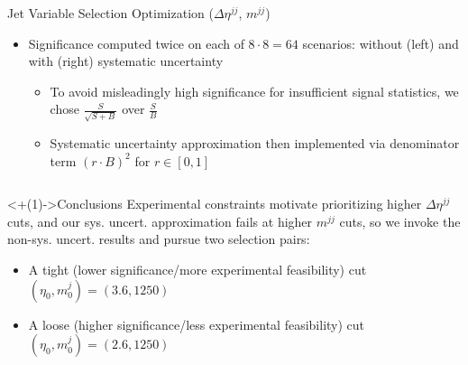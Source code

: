 \documentclass[handout]{beamer}
\begin{document}
\begin{frame}{Jet Variable Selection Optimization ($\Delta \eta^{jj}$, $m^{jj}$)}
\begin{block}
\begin{itemize}[<+(1)->]
            $(\eta_0, m^j_0) \in \{2.6, 3.1, 3.6, 4.1, 4.6, 5.1, 5.6, 6.1\} \times \{120, 500, 750, 1000, 1250, 1500, 1750, 2000\}$
            \item Significance computed twice on each of $8 \cdot 8 = 64$ scenarios: without (left) and with (right) systematic uncertainty
            \begin{itemize}[<+(1)->]
                \item To avoid misleadingly high significance for insufficient signal statistics, we chose $\frac{S}{\sqrt{S + B}}$ over $\frac{S}{B}$ 
                \item Systematic uncertainty approximation then implemented via denominator term $(r \cdot B)^2$ for $r \in [0,1]$
            \end{itemize}
        \end{itemize}
    \end{block}
    \begin{columns}
    \end{columns}
    \begin{block}<+(1)->{Conclusions}
        Experimental constraints motivate prioritizing higher $\Delta \eta^{jj}$ cuts, and our sys. uncert. approximation fails at higher $m^{jj}$ cuts, so we invoke the non-sys. uncert. results and pursue two selection pairs:
        \begin{itemize}
            \item A tight (lower significance/more experimental feasibility) cut $(\eta_0, m^j_0) = (3.6, 1250)$
            \item A loose (higher significance/less experimental feasibility) cut $(\eta_0, m^j_0) = (2.6, 1250)$
        \end{itemize} 
    \end{block}
\end{frame}
\end{document}
